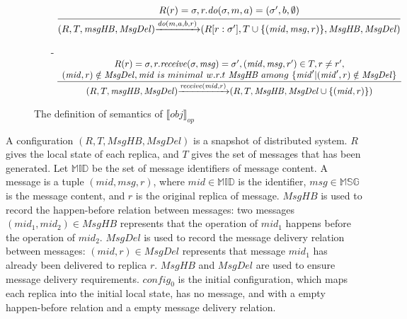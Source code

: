 {\begin{figure}[ht]
\begin{itemize}
\item[] $\begin{array}{l c}
   \bigfrac{
   \begin{array}{c}
     R(r) = \sigma, r.\mathit{do}(\sigma,m,a) = (\sigma',b,\emptyset)
   \end{array}}
     {(R,T,\mathit{msgHB},\mathit{MsgDel}) {\xrightarrow{\mathit{do}(m,a,b,r)}} (R[r:\sigma'], T \cup \{ (\mathit{mid},\mathit{msg},r) \}, \mathit{MsgHB},\mathit{MsgDel})}
\end{array}$

\item[-] $\begin{array}{l c}
   \bigfrac{
   \begin{array}{c}
      R(r) = \sigma, r.\mathit{receive}(\sigma,\mathit{msg}) = \sigma', (\mathit{mid},\mathit{msg},r') \in T, r \neq r', \\
      (\mathit{mid},r) \notin \mathit{MsgDel}, \mathit{mid} \ is \ minimal \ w.r.t \ \mathit{MsgHB} \ among \ \{ \mathit{mid}' \vert (\mathit{mid}',r) \notin \mathit{MsgDel} \}
   \end{array}}
     {(R,T,\mathit{msgHB},\mathit{MsgDel}) {\xrightarrow{\mathit{receive}(\mathit{mid},r)}} (R,T,\mathit{MsgHB},\mathit{MsgDel} \cup \{ (\mathit{mid},r) \} )}
\end{array}$
\end{itemize}
\caption{The definition of semantics of $\llbracket \mathit{obj} \rrbracket_{\mathit{op}}$}
\label{fig:the semantics of a operation-based CRDT object}
\end{figure}

A configuration $(R,T,\mathit{MsgHB},\mathit{MsgDel})$ is a snapshot of distributed system. $R$ gives the local state of each replica, and $T$ gives the set of messages that has been generated. Let $\mathbb{MID}$ be the set of message identifiers of message content. A message is a tuple $(\mathit{mid},\mathit{msg},r)$, where $\mathit{mid} \in \mathbb{MID}$ is the identifier, $\mathit{msg} \in \mathbb{MSG}$ is the message content, and $r$ is the original replica of message. $\mathit{MsgHB}$ is used to record the happen-before relation between messages: two messages $(\mathit{mid}_1,\mathit{mid}_2) \in \mathit{MsgHB}$ represents that the operation of $\mathit{mid}_1$ happens before the operation of $\mathit{mid}_2$. $\mathit{MsgDel}$ is used to record the message delivery relation between messages: $(\mathit{mid},r) \in \mathit{MsgDel}$ represents that message $\mathit{mid}_1$ has already been delivered to replica $r$. $\mathit{MsgHB}$ and $\mathit{MsgDel}$ are used to ensure message delivery requirements. $\mathit{config}_0$ is the initial configuration, which maps each replica into the initial local state, has no message, and with a empty happen-before relation and a empty message delivery relation.


}

